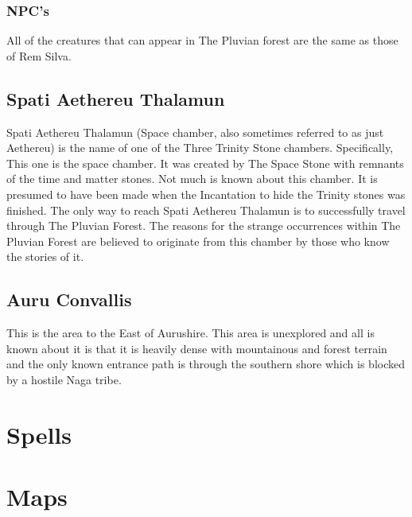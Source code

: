 \documentclass[letterpaper,10pt,twoside,twocolumn,openany]{book}
\begin{document}
\subsection{NPC's}
All of the creatures that can appear in The Pluvian forest are the same as those of Rem Silva.

\section{Spati Aethereu Thalamun}

Spati Aethereu Thalamun (Space chamber, also sometimes referred to as just Aethereu) is the name of one of the Three Trinity Stone chambers. Specifically, This one is the space chamber. It was created by The Space Stone with remnants of the time and matter stones. Not much is known about this chamber. It is presumed to have been made when the Incantation to hide the Trinity stones was finished. The only way to reach Spati Aethereu Thalamun is to successfully travel through The Pluvian Forest. The reasons for the strange occurrences within The Pluvian Forest are believed to originate from this chamber by those who know the stories of it.



\section{Auru Convallis}

This is the area to the East of Aurushire. This area is unexplored and all is known about it is that it is heavily dense with mountainous and forest terrain and the only known entrance path is through the southern shore which is blocked by a hostile Naga tribe.



\chapter{Spells}





\onecolumn
\chapter{Maps}
\end{document}
